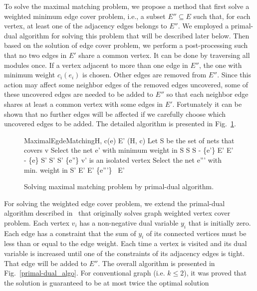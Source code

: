 \documentclass[journal]{IEEEtran}
\begin{document}
To solve the maximal matching problem, we propose a method that 
first solve a weighted minimum edge cover problem, i.e., a subset $E''
\subseteq E$ such that, for each vertex, at least one of the adjacency
edges belongs to $E''$. We employed a primal-dual algorithm
for solving this problem that will be described later below.
Then based on the solution of edge cover problem, we perform a
post-processing such that no two edges in $E'$ share a common vertex.
It can be done by traversing all modules once. If a vertex adjacent to
more than one edge in $E''$, the one with minimum weight $c_i(e_i)$ is
chosen. Other edges are removed from $E''$. Since this action may affect
some neighbor edges of the removed edges uncovered, some of these
uncovered edges are needed to be added to $E''$ so that each neighbor
edge shares at least a common vertex with some edges in $E'$.
Fortunately it can be shown that no further edges will be affected if
we carefully choose which uncovered edges to be added. 
The detailed
algorithm is presented in Fig.~\ref{maximal-matching}.
\begin{figure}
\begin{algo}{MaximalEgdeMatching}{H, c(e) }
  E' \: (H, c)
      \@{Let } S \@{ be the set of nets that covers } v
      \@{Select the net } e' \@{ with minimum weight in } S
      S \: S - \{e'\}
         E' \: E' - \{e\}
      \ENDFOR
               S' \: \emptyset
                   S' \: S' \cup \{e''\}
                 \ENDIF
               \ENDFOR
                  v' \@{ is an isolated vertex}
               \ELSE
                  \@{Select the net } e''' \@{ with min. weight in } S'
                  E' \: E' \cup \{e'''\}
               \ENDIF
            \ENDIF
         \ENDFOR
      \ENDFOR
    \ENDIF
  \ENDFOR
  \RETURN\ E'
\end{algo}
\caption{Solving maximal matching problem by primal-dual algorithm.}
\label{maximal-matching}
\end{figure}

For solving the weighted edge cover problem, 
we extend the primal-dual algorithm described in~\cite{approximation_1999}
that originally solves graph weighted vertex cover problem. Each
vertex $v_i$ has a non-negative dual variable $y_i$ that is initially
zero. Each edge
has a constraint that the sum of $y_i$ of its connected vertices must
be less than or equal to the edge weight. Each time a vertex is visited
and its dual variable is increased until one of the constraints of its
adjacency edges is tight. That edge will be added to $E''$.
The overall algorithm is presented in Fig.~\ref{primal-dual_algo}.
For conventional graph (i.e. $k \leq 2$), it was proved that the
solution is guaranteed to be at most twice the optimal
solution~\cite{approximation_1999}
\end{document}
